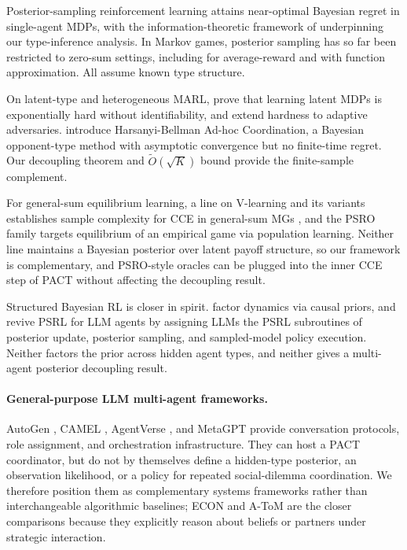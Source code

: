 \documentclass{article}
\begin{document}
Posterior-sampling reinforcement learning \citep{strens2000bayesian,osband2013more,agrawal2017optimistic,ouyang2017learning} attains near-optimal Bayesian regret in single-agent MDPs, with the information-theoretic framework of \citet{russo2014learning,russo2016information} underpinning our type-inference analysis. In Markov games, posterior sampling has so far been restricted to zero-sum settings, including \citet{jafarnia2024bayesian} for average-reward and \citet{xiong2022self} with function approximation. All assume known type structure.

On latent-type and heterogeneous MARL, \citet{kwon2021rl} prove that learning latent MDPs is exponentially hard without identifiability, and \citet{nguyentang2024learning} extend hardness to adaptive adversaries. \citet{albrecht2013game,albrecht2019convergence} introduce Harsanyi-Bellman Ad-hoc Coordination, a Bayesian opponent-type method with asymptotic convergence but no finite-time regret. Our decoupling theorem and $\tilde O(\sqrt K)$ bound provide the finite-sample complement.

For general-sum equilibrium learning, a line on V-learning and its variants establishes sample complexity for CCE in general-sum MGs \citep{jin2021v,song2022when,mao2023decentralized,erez2023regret,yang2025incentivize}, and the PSRO family \citep{lanctot2017unified,muller2020generalized,marris2021multi} targets equilibrium of an empirical game via population learning. Neither line maintains a Bayesian posterior over latent payoff structure, so our framework is complementary, and PSRO-style oracles can be plugged into the inner CCE step of PACT without affecting the decoupling result.

Structured Bayesian RL is closer in spirit. \citet{mutti2024exploiting} factor dynamics via causal priors, and \citet{arumugamgriffiths2026exploration} revive PSRL for LLM agents by assigning LLMs the PSRL subroutines of posterior update, posterior sampling, and sampled-model policy execution. Neither factors the prior across hidden agent types, and neither gives a multi-agent posterior decoupling result.

\paragraph{General-purpose LLM multi-agent frameworks.} AutoGen \citep{wu2023autogen}, CAMEL \citep{li2023camel}, AgentVerse \citep{chen2023agentverse}, and MetaGPT \citep{hong2023metagpt} provide conversation protocols, role assignment, and orchestration infrastructure. They can host a PACT coordinator, but do not by themselves define a hidden-type posterior, an observation likelihood, or a policy for repeated social-dilemma coordination. We therefore position them as complementary systems frameworks rather than interchangeable algorithmic baselines; ECON and A-ToM are the closer comparisons because they explicitly reason about beliefs or partners under strategic interaction.
\end{document}
